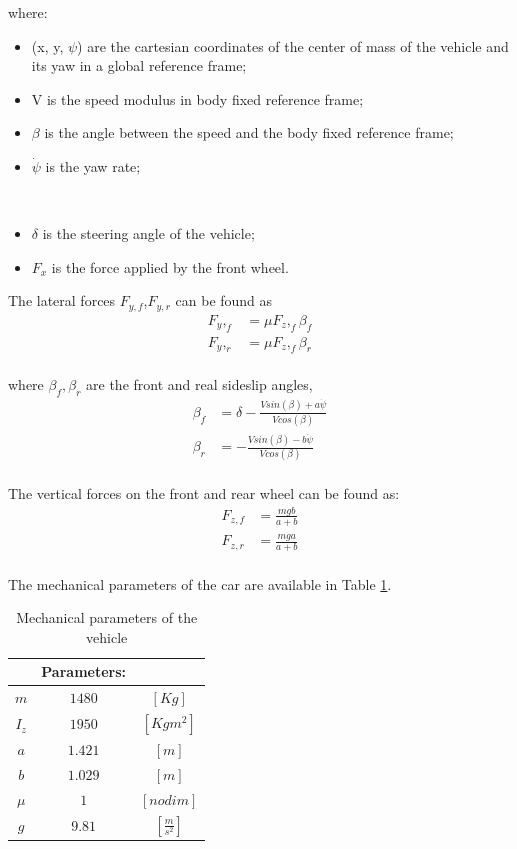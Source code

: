 \documentclass[a4paper,11pt,oneside]{book}
\begin{document}
where:
\begin{itemize}
    \item (x, y, $\psi$) are the cartesian coordinates of the center of mass of the vehicle and its yaw in a global reference frame;
    \item V is the speed modulus in body fixed reference frame;
    \item $\beta$ is the angle between the speed and the body fixed reference frame;
    \item $\dot\psi$ is the yaw rate;
\end{itemize}
\\
\begin{itemize}
    \item $\delta$ is the steering angle of the vehicle;
    \item $F_x$ is the force applied by the front wheel.
\end{itemize}
The lateral forces $F_{y,f}$,$F_{y,r}$  can be found as 
\begin{align*}
    F_y,_f &= \mu F_z,_f \beta_f\\
    F_y,_r &= \mu F_z,_f \beta_r
\end{align*}
\\
where $\beta_f , \beta_r$ are the front and real sideslip angles, 
\begin{align*}
    \beta_f &= \delta - \frac{V sin(\beta) + a \dot \psi}{V cos(\beta)}\\
    \beta_r &= - \frac{V sin(\beta) - b \dot \psi}{V cos(\beta)}
\end{align*}
\\
The vertical forces on the front and rear wheel can be found as: 
\begin{align*}
    F_{z,f} &= \frac{m g b}{a+ b}\\
    F_{z,r} &= \frac{m g a}{a+ b}
\end{align*}
\\
The mechanical parameters of the car are available in Table \ref{param_table}. 
\begin{table}[h]
\begin{center}
\begin{tabular}{c|c c}
\multicolumn{1}{l|}{} & \multicolumn{1}{l}{\textbf{Parameters:}} \\ \hline
$m$                    & $1480$ &$[Kg]$                             \\
$I_z$                    & $1950$ &$[Kgm^2]$                             \\
$a$                    & $1.421$ &$[m]$                             \\
$b$                    & $1.029$ &$[m]$                             \\
$\mu$                    & $1$ &$[nodim]$                             \\
$g$                    & $9.81$ &$[\frac{m}{s^2}]$                             
\end{tabular}
\caption{\label{param_table}Mechanical parameters of the vehicle}
\end{center}
\end{table}
\end{document}
